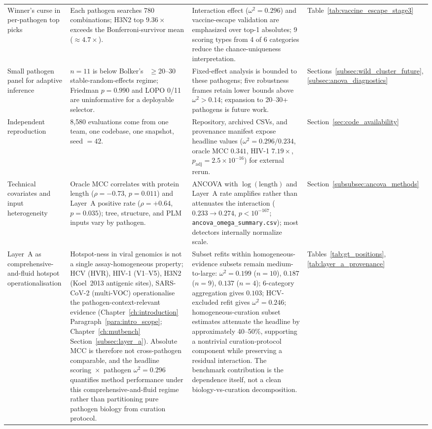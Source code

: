 {\begin{longtable}{p{}p{}p{}p{}}
Winner's curse in per-pathogen top picks & Each pathogen searches 780 combinations; H3N2 top $9.36\times$ exceeds the Bonferroni-survivor mean ($\approx 4.7\times$). & Interaction effect ($\omega^2 = 0.296$) and vaccine-escape validation are emphasized over top-1 absolutes; 9 scoring types from 4 of 6 categories reduce the chance-uniqueness interpretation. & Table~\ref{tab:vaccine_escape_stage3} \\
Small pathogen panel for adaptive inference & $n = 11$ is below Bolker's~\cite{bolker2009glmm} $\geq$20--30 stable-random-effects regime; Friedman $p = 0.990$ and LOPO 0/11 are uninformative for a deployable selector. & Fixed-effect analysis is bounded to these pathogens; five robustness frames retain lower bounds above $\omega^2 > 0.14$; expansion to 20--30+ pathogens is future work. & Sections~\ref{subsec:wild_cluster_future}, \ref{subsec:anova_diagnostics} \\
Independent reproduction & 8{,}580 evaluations come from one team, one codebase, one snapshot, seed $=42$. & Repository, archived CSVs, and provenance manifest expose headline values ($\omega^2 = 0.296 / 0.234$, oracle MCC $0.341$, HIV-1 $7.19\times$, $p_{\text{adj}} = 2.5 \times 10^{-16}$) for external rerun. & Section~\ref{sec:code_availability} \\
Technical covariates and input heterogeneity & Oracle MCC correlates with protein length ($\rho = -0.73$, $p = 0.011$) and Layer~A positive rate ($\rho = +0.64$, $p = 0.035$); tree, structure, and PLM inputs vary by pathogen. & ANCOVA with $\log(\text{length})$ and Layer~A rate amplifies rather than attenuates the interaction ($0.233 \to 0.274$, $p < 10^{-167}$; \texttt{ancova\_omega\_summary.csv}); most detectors internally normalize scale. & Section~\ref{subsubsec:ancova_methods} \\
Layer~A as comprehensive-and-fluid hotspot operationalisation & Hotspot-ness in viral genomics is not a single assay-homogeneous property; HCV (HVR), HIV-1 (V1--V5), H3N2 (Koel~2013 antigenic sites), SARS-CoV-2 (multi-VOC) operationalise the pathogen-context-relevant evidence (Chapter~\ref{ch:introduction} Paragraph~\ref{para:intro_scope}; Chapter~\ref{ch:mutbench} Section~\ref{subsec:layer_a}). Absolute MCC is therefore not cross-pathogen comparable, and the headline scoring~$\times$~pathogen $\omega^2 = 0.296$ quantifies method performance under this comprehensive-and-fluid regime rather than partitioning pure pathogen biology from curation protocol. & Subset refits within homogeneous-evidence subsets remain medium-to-large: $\omega^2 = 0.199$ ($n = 10$), $0.187$ ($n = 9$), $0.137$ ($n = 4$); 6-category aggregation gives $0.103$; HCV-excluded refit gives $\omega^2 = 0.246$; homogeneous-curation subset estimates attenuate the headline by approximately 40--50\%, supporting a nontrivial curation-protocol component while preserving a residual interaction. The benchmark contribution is the dependence itself, not a clean biology-vs-curation decomposition. & Tables~\ref{tab:gt_positions}, \ref{tab:layer_a_provenance} \\

\end{longtable}}
